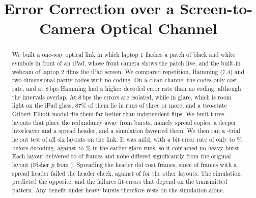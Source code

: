 \documentclass[conference,a4paper]{IEEEtran}
\begin{document}
\title{Error Correction over a Screen-to-Camera Optical Channel}
\author{
}
\maketitle

\begin{abstract}
We built a one-way optical link in which laptop 1 flashes a patch of black and white symbols in front
of an iPad, whose front camera shows the patch live, and the built-in webcam of laptop 2 films the
iPad screen. We compared repetition, Hamming (7,4) and two-dimensional parity
codes with no coding. On a clean channel the codes only cost rate, and at 8\,bps Hamming had a
higher decoded error rate than no coding, although the intervals overlap. At 8\,bps the errors are
isolated, while in glare, which is room light on the iPad glass, 87\% of them lie in runs of three
or more, and a two-state Gilbert-Elliott model fits them far better than independent flips. We built three layouts that place the redundancy away
from bursts, namely spread copies, a deeper interleaver and a spread header, and a simulation favoured
them. We then ran a \physTrials-trial layout test of all six layouts on the link. It was mild, with a bit error
rate of only \physChLo{} to \physChHi\% before decoding, against \earlyChLo{} to \earlyChHi\% in the
earlier glare runs, so it contained no heavy burst. Each layout delivered
\physFramesLo{} to \physFramesHi{} of \physPerLayout{} frames and none differed significantly from
the original layout (Fisher $p$ from \physPLo{}). Spreading the header did cost frames, since
\hdrFailSh{} of \hdrFailShN{} frames with a spread header failed the header check, against
\hdrFailOt{} of \hdrFailOtN{} for the other layouts. The simulation predicted the opposite, and the
failures fit errors that depend on the transmitted pattern. Any benefit under heavy bursts therefore
rests on the simulation alone.
\end{abstract}
\end{document}
